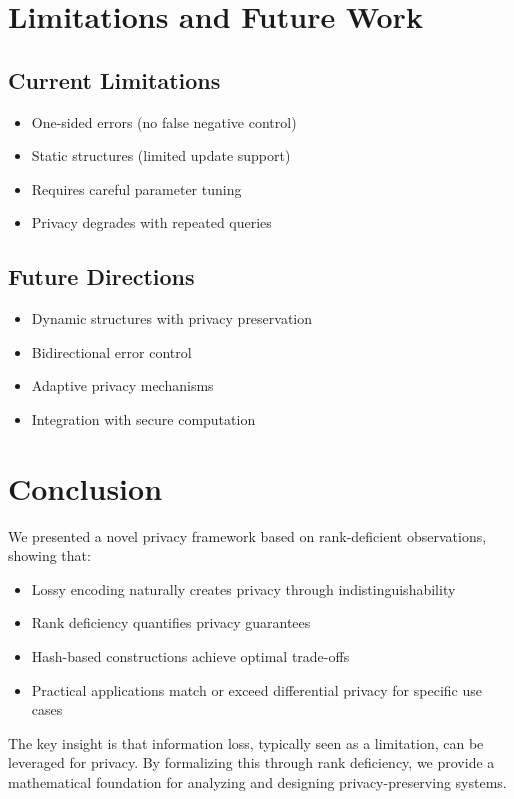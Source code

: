 \documentclass[11pt]{article}
\begin{document}
\section{Limitations and Future Work}

\subsection{Current Limitations}
\begin{itemize}
\item One-sided errors (no false negative control)
\item Static structures (limited update support)
\item Requires careful parameter tuning
\item Privacy degrades with repeated queries
\end{itemize}

\subsection{Future Directions}
\begin{itemize}
\item Dynamic structures with privacy preservation
\item Bidirectional error control
\item Adaptive privacy mechanisms
\item Integration with secure computation
\end{itemize}

\section{Conclusion}

We presented a novel privacy framework based on rank-deficient observations, showing that:
\begin{itemize}
\item Lossy encoding naturally creates privacy through indistinguishability
\item Rank deficiency quantifies privacy guarantees
\item Hash-based constructions achieve optimal trade-offs
\item Practical applications match or exceed differential privacy for specific use cases
\end{itemize}

The key insight is that information loss, typically seen as a limitation, can be leveraged for privacy. By formalizing this through rank deficiency, we provide a mathematical foundation for analyzing and designing privacy-preserving systems.
\end{document}
